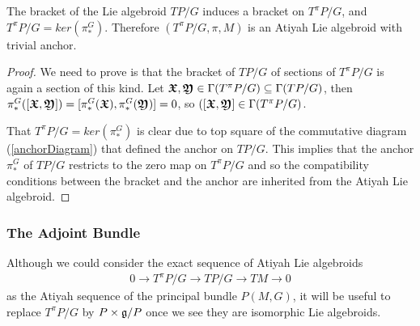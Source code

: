 \begin{theorem}
The bracket of the Lie algebroid $TP/G$ induces a bracket on $T^\pi P/G$, and $T^\pi P/G = ker(\pi_*^G)$. Therefore $(T^\pi P/G, \pi, M)$ is an Atiyah Lie algebroid with trivial anchor.
\end{theorem}

\begin{proof}
We need to prove is that the bracket of $TP/G$ of sections of $T^\pi P/G$ is again a section of this kind. Let $\bm{\mathfrak{X}}, \bm{\mathfrak{Y}} \in \Gamma(T^\pi P/G) \subseteq \Gamma(TP/G)$, then $\pi_*^G([\bm{\mathfrak{X}}, \bm{\mathfrak{Y}}]) = [\pi_*^G (\bm{\mathfrak{X}}), \pi_*^G(\bm{\mathfrak{Y}})] = 0$, so $([\bm{\mathfrak{X}}, \bm{\mathfrak{Y}}] \in \Gamma(T^\pi P/G)$. 

That $T^\pi P/G = ker(\pi_*^G)$ is clear due to top square of the commutative diagram (\ref{anchorDiagram}) that defined the anchor on $TP/G$. This implies that the anchor $\pi_*^G$ of $TP/G$ restricts to the zero map on $T^\pi P/G$ and so the compatibility conditions between the bracket and the anchor are inherited from the Atiyah Lie algebroid.
\end{proof}

\subsubsection{The Adjoint Bundle}

Although we could consider the exact sequence of Atiyah Lie algebroids
\begin{align*}
    0 \to T^\pi P/G \to TP/G \to TM \to 0
\end{align*}
as the Atiyah sequence of the principal bundle $P(M, G)$, it will be useful to replace $T^\pi P/G$ by $P \times \mathfrak{g}/P$ once we see they are isomorphic Lie algebroids.


